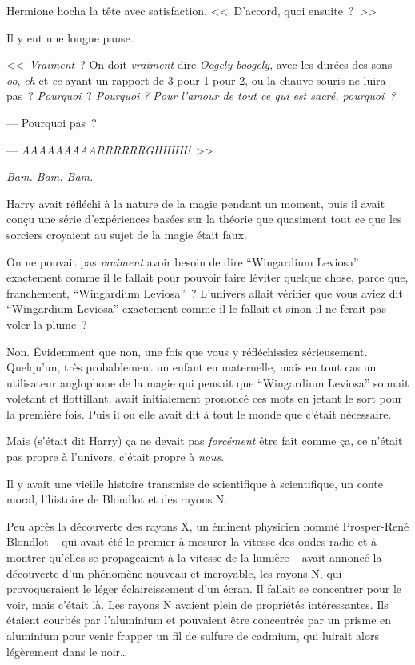 Hermione hocha la tête avec satisfaction. <<~D'accord, quoi ensuite~?~>>

Il y eut une longue pause.

<<~\emph{Vraiment}~? On doit \emph{vraiment} dire \emph{Oogely boogely}, avec les durées des sons \emph{oo}, \emph{eh} et \emph{ee} ayant un rapport de 3 pour 1 pour 2, ou la chauve-souris ne luira pas~? \emph{Pourquoi}~? \emph{Pourquoi} \emph{? Pour l'amour de tout ce qui est sacré, pourquoi~?}

--- Pourquoi pas~?

--- \emph{AAAAAAAAARRRRRRGHHHH!}~>>

\emph{Bam. Bam. Bam.}

Harry avait réfléchi à la nature de la magie pendant un moment, puis il avait conçu une série d'expériences basées sur la théorie que quasiment tout ce que les sorciers croyaient au sujet de la magie était faux.

On ne pouvait pas \emph{vraiment} avoir besoin de dire “Wingardium Leviosa” exactement comme il le fallait pour pouvoir faire léviter quelque chose, parce que, franchement, “Wingardium Leviosa”~? L'univers allait vérifier que vous aviez dit “Wingardium Leviosa” exactement comme il le fallait et sinon il ne ferait pas voler la plume~?

Non. Évidemment que non, une fois que vous y réfléchissiez sérieusement. Quelqu'un, très probablement un enfant en maternelle, mais en tout cas un utilisateur anglophone de la magie qui pensait que “Wingardium Leviosa” sonnait voletant et flottillant, avait initialement prononcé ces mots en jetant le sort pour la première fois. Puis il ou elle avait dit à tout le monde que c'était nécessaire.

Mais (s'était dit Harry) ça ne devait pas \emph{forcément} être fait comme ça, ce n'était pas propre à l'univers, c'était propre à \emph{nous}.

Il y avait une vieille histoire transmise de scientifique à scientifique, un conte moral, l'histoire de Blondlot et des rayons N.

Peu après la découverte des rayons X, un éminent physicien nommé Prosper-René Blondlot -- qui avait été le premier à mesurer la vitesse des ondes radio et à montrer qu'elles se propageaient à la vitesse de la lumière -- avait annoncé la découverte d'un phénomène nouveau et incroyable, les rayons N, qui provoqueraient le léger éclaircissement d'un écran. Il fallait se concentrer pour le voir, mais c'était là. Les rayons N avaient plein de propriétés intéressantes. Ils étaient courbés par l'aluminium et pouvaient être concentrés par un prisme en aluminium pour venir frapper un fil de sulfure de cadmium, qui luirait alors légèrement dans le noir…

